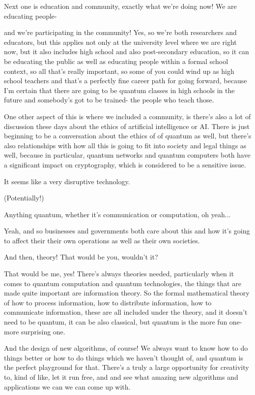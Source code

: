 \mmm Next one is education and community, exactly what we're doing now! We are educating people-

\rrr and we're participating in the community! Yes, so we're both researchers and educators, but this applies not only at the university level where we are right now, but it also includes high school and also post-secondary education, so it can be educating the public as well as educating people within a formal school context, so all that's really important, so some of you could wind up as high school teachers and that's a perfectly fine career path for going forward, because I'm certain that there are going to be quantum classes in high schools in the future and somebody's got to be trained- the people who teach those.

One other aspect of this is where we included a community, is there's also a lot of discussion these days about the ethics of artificial intelligence or AI. There is just beginning to be a conversation about the ethics of of quantum as well, but there's also relationships with how all this is going to fit into society and legal things as well, because in particular, quantum networks and quantum computers both have a significant impact on cryptography, which is considered to be a sensitive issue.

\mmm It seems like a very disruptive technology. 

\rrr (Potentially!)

\mmm Anything quantum, whether it's communication or computation, oh yeah...

\rrr Yeah, and so businesses and governments both care about this and how it's going to affect their their own operations as well as their own societies.

And then, theory! That would be you, wouldn't it?

\mmm That would be me, yes! There's always theories needed, particularly when it comes to quantum computation and quantum technologies, the things that are made quite important are information theory. So the formal mathematical theory of how to process information, how to distribute information, how to communicate information, these are all included under the theory, and it doesn't need to be quantum, it can be also classical, but quantum is the more fun one- more surprising one.

And the design of new algorithms, of course! We always want to know how to do things better or how to do things which we haven't thought of, and quantum is the perfect playground for that. There's a truly a large opportunity for creativity to, kind of like, let it run free, and and see what amazing new algorithms and applications we can we can come up with.

